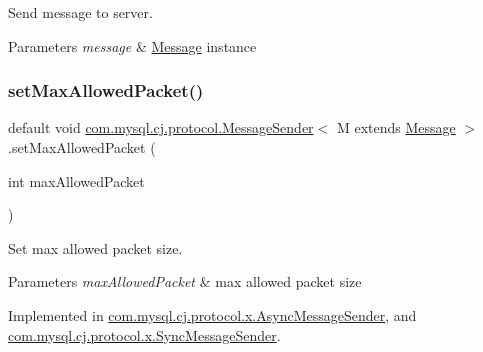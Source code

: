 Send message to server.


\begin{DoxyParams}{Parameters}
{\em message} & \mbox{\hyperlink{interfacecom_1_1mysql_1_1cj_1_1protocol_1_1_message}{Message}} instance \\
\hline
\end{DoxyParams}
\mbox{\label{interfacecom_1_1mysql_1_1cj_1_1protocol_1_1_message_sender_a31345b7817dcc7e982bb96dba97b3a01}} 
\subsubsection{\texorpdfstring{set\+Max\+Allowed\+Packet()}{setMaxAllowedPacket()}}
{\footnotesize\ttfamily default void \mbox{\hyperlink{interfacecom_1_1mysql_1_1cj_1_1protocol_1_1_message_sender}{com.\+mysql.\+cj.\+protocol.\+Message\+Sender}}$<$ M extends \mbox{\hyperlink{interfacecom_1_1mysql_1_1cj_1_1protocol_1_1_message}{Message}} $>$.set\+Max\+Allowed\+Packet (\begin{DoxyParamCaption}\item[{int}]{max\+Allowed\+Packet }\end{DoxyParamCaption})}

Set max allowed packet size.


\begin{DoxyParams}{Parameters}
{\em max\+Allowed\+Packet} & max allowed packet size \\
\hline
\end{DoxyParams}


Implemented in \mbox{\hyperlink{classcom_1_1mysql_1_1cj_1_1protocol_1_1x_1_1_async_message_sender_a9350fb34edd02d90eebe96812dd85e25}{com.\+mysql.\+cj.\+protocol.\+x.\+Async\+Message\+Sender}}, and \mbox{\hyperlink{classcom_1_1mysql_1_1cj_1_1protocol_1_1x_1_1_sync_message_sender_aa403c14cdcc078b9250830c85f6dbbf9}{com.\+mysql.\+cj.\+protocol.\+x.\+Sync\+Message\+Sender}}.

\mbox{\label{interfacecom_1_1mysql_1_1cj_1_1protocol_1_1_message_sender_a3a352bf35ad98dc6cea7c1f4ac9480da}} 
